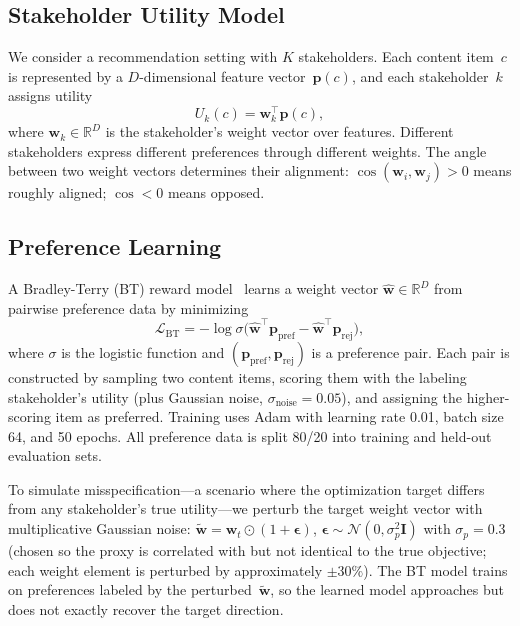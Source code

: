 \documentclass[11pt,letterpaper]{article}
\begin{document}
\subsection{Stakeholder Utility Model}

We consider a recommendation setting with $K$ stakeholders. Each
content item~$c$ is represented by a $D$-dimensional feature
vector~$\mathbf{p}(c)$, and each stakeholder~$k$ assigns utility
\begin{equation}
  U_k(c) = \mathbf{w}_k^\top \mathbf{p}(c),
  \label{eq:utility}
\end{equation}
where $\mathbf{w}_k \in \mathbb{R}^D$ is the stakeholder's weight
vector over features. Different stakeholders express different
preferences through different weights. The angle between two weight
vectors determines their alignment:
$\cos(\mathbf{w}_i, \mathbf{w}_j) > 0$ means roughly aligned;
$\cos < 0$ means opposed.

\subsection{Preference Learning}
\label{sec:bt}

A Bradley-Terry (BT) reward model~\cite{bradley1952rank} learns a
weight vector $\hat{\mathbf{w}} \in \mathbb{R}^D$ from pairwise
preference data by minimizing
\begin{equation}
  \mathcal{L}_{\text{BT}} = -\log \sigma\!\bigl(
    \hat{\mathbf{w}}^\top \mathbf{p}_{\text{pref}}
    - \hat{\mathbf{w}}^\top \mathbf{p}_{\text{rej}}
  \bigr),
  \label{eq:btloss}
\end{equation}
where $\sigma$ is the logistic function and
$(\mathbf{p}_{\text{pref}}, \mathbf{p}_{\text{rej}})$ is a
preference pair. Each pair is constructed by sampling two content
items, scoring them with the labeling stakeholder's utility (plus
Gaussian noise, $\sigma_{\text{noise}} = 0.05$), and assigning the
higher-scoring item as preferred. Training uses Adam with learning
rate 0.01, batch size 64, and 50 epochs. All preference data is
split 80/20 into training and held-out evaluation sets.

To simulate misspecification---a scenario where the optimization
target differs from any stakeholder's true utility---we perturb
the target weight vector with multiplicative Gaussian noise:
$\tilde{\mathbf{w}} = \mathbf{w}_t \odot (1 + \boldsymbol{\epsilon})$,
$\boldsymbol{\epsilon} \sim \mathcal{N}(0, \sigma_p^2 \mathbf{I})$
with $\sigma_p = 0.3$ (chosen so the proxy is correlated with but
not identical to the true objective; each weight element is perturbed
by approximately $\pm 30\%$). The BT model trains on preferences
labeled by the perturbed~$\tilde{\mathbf{w}}$, so the learned model
approaches but does not exactly recover the target direction.
\end{document}
